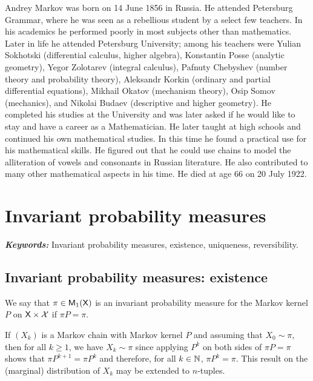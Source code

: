 \documentclass[english,graybox,envcountchap,envcountsame,sectrefs,shortlabels]{svmono}
\theoremstyle{style}
\renewenvironment{keywords}{\textit{\bf Keywords: } \sffamily }{}
\begin{document}
\begin{subappendices}
Andrey Markov was born on 14 June 1856 in Russia. He attended Petersburg
Grammar, where he was seen as a rebellious student by a select few
teachers. In his academics he performed poorly in most subjects other
than mathematics. Later in life he attended Petersburg University;
among his teachers were Yulian Sokhotski (differential calculus, higher
algebra), Konstantin Posse (analytic geometry), Yegor Zolotarev (integral
calculus), Pafnuty Chebyshev (number theory and probability theory),
Aleksandr Korkin (ordinary and partial differential equations), Mikhail
Okatov (mechanism theory), Osip Somov (mechanics), and Nikolai Budaev
(descriptive and higher geometry). He completed his studies at the
University and was later asked if he would like to stay and have a
career as a Mathematician. He later taught at high schools and continued
his own mathematical studies. In this time he found a practical use
for his mathematical skills. He figured out that he could use chains
to model the alliteration of vowels and consonants in Russian literature.
He also contributed to many other mathematical aspects in his time.
He died at age 66 on 20 July 1922.

\end{subappendices}

\chapter{Invariant probability measures}
\minitoc
\begin{keywords}
Invariant probability measures, existence, uniqueness, reversibility.
\end{keywords}
\section{Invariant probability measures: existence}
\begin{framed}%
\begin{definition}
We say that $\pi\in\mathsf{M}_{1}(\mathsf{X})$ is an invariant probability measure
for the Markov kernel $P$ on $\mathsf{X}\times\mathcal{X}$ if $\pi P=\pi$.
\end{definition}
\end{framed}

If $(X_{k})$ is a Markov chain with Markov kernel $P$
and assuming that $X_{0}\sim\pi$, then for all $k\geq1$, we have
$X_{k}\sim\pi$ since applying $P^{k}$ on
both sides of $\pi P=\pi$ shows that $\pi P^{k+1}=\pi P^{k}$ and
therefore, for all $k\in\mathbb{N}$, $\pi P^{k}=\pi$. This result on
the (marginal) distribution of $X_{k}$ may be extended to $n$-tuples.
\end{document}
